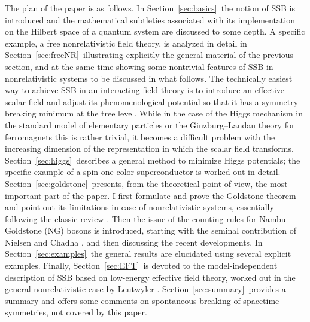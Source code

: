\documentclass[final,3p,times,12pt,a4paper,sort&compress]{elsarticle}
\begin{document}
The plan of the paper is as follows. In Section~\ref{sec:basics}\ the notion of
SSB is introduced and the mathematical subtleties associated with its
implementation on the Hilbert space of a quantum system are discussed to some
depth. A specific example, a free nonrelativistic field theory, is analyzed in
detail in Section~\ref{sec:freeNR}\ illustrating explicitly the general material
of the previous section, and at the same time showing some nontrivial features
of SSB in nonrelativistic systems to be discussed in what follows. The
technically easiest way to achieve SSB in an interacting field theory is to
introduce an effective scalar field and adjust its phenomenological potential
so that it has a symmetry-breaking minimum at the tree level. While in the case
of the Higgs mechanism in the standard model of elementary particles or the
Ginzburg--Landau theory for ferromagnets this is rather trivial, it becomes a
difficult problem with the increasing dimension of the representation in which
the scalar field transforms. Section~\ref{sec:higgs}\ describes a general method
to minimize Higgs potentials; the specific example of a spin-one color
superconductor is worked out in detail. Section~\ref{sec:goldstone}\ presents,
from the theoretical point of view, the most important part of the paper. I
first formulate and prove the Goldstone theorem and point out its limitations
in case of nonrelativistic systems, essentially following the classic review
\cite{Guralnik:1968gu}. Then the issue of the counting rules for
Nambu--Goldstone (NG) bosons is introduced, starting with the seminal
contribution of Nielsen and Chadha \cite{Nielsen:1975hm}, and then discussing
the recent developments. In Section~\ref{sec:examples}\ the general results are
elucidated using several explicit examples. Finally, Section~\ref{sec:EFT}\ is
devoted to the model-independent description of SSB based on low-energy
effective field theory, worked out in the general nonrelativistic case by
Leutwyler \cite{Leutwyler:1993gf}. Section~\ref{sec:summary}\ provides a summary
and offers some comments on spontaneous breaking of spacetime symmetries, not
covered by this paper.
\end{document}
